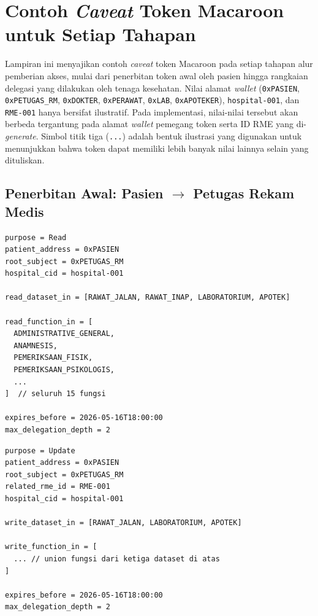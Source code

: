 \chapter{Contoh \textit{Caveat} Token Macaroon untuk Setiap Tahapan}
\label{lampiran:contoh-caveat-macaroon}

Lampiran ini menyajikan contoh \textit{caveat} token Macaroon pada setiap tahapan alur pemberian akses, mulai dari penerbitan token awal oleh pasien hingga rangkaian delegasi yang dilakukan oleh tenaga kesehatan. Nilai alamat \textit{wallet} (\texttt{0xPASIEN}, \texttt{0xPETUGAS\_RM}, \texttt{0xDOKTER}, \texttt{0xPERAWAT}, \texttt{0xLAB}, \texttt{0xAPOTEKER}), \texttt{hospital-001}, dan \texttt{RME-001} hanya bersifat ilustratif. Pada implementasi, nilai-nilai tersebut akan berbeda tergantung pada alamat \textit{wallet} pemegang token serta ID RME yang di-\textit{generate}. Simbol titik tiga (\texttt{...}) adalah bentuk ilustrasi yang digunakan untuk menunjukkan bahwa token dapat memiliki lebih banyak nilai lainnya selain yang dituliskan.

\section*{Penerbitan Awal: Pasien $\rightarrow$ Petugas Rekam Medis}
\label{subsec:contoh-caveat-token-macaroon-penerbitan-awal}

\begin{lstlisting}[caption={Contoh \textit{Caveat} Token \texttt{Read} Awal untuk Petugas Rekam Medis}, label={lst:contoh-token-baca-awal-rekam-medis}]
purpose = Read
patient_address = 0xPASIEN
root_subject = 0xPETUGAS_RM
hospital_cid = hospital-001

read_dataset_in = [RAWAT_JALAN, RAWAT_INAP, LABORATORIUM, APOTEK]

read_function_in = [
  ADMINISTRATIVE_GENERAL,
  ANAMNESIS,
  PEMERIKSAAN_FISIK,
  PEMERIKSAAN_PSIKOLOGIS,
  ...
]  // seluruh 15 fungsi

expires_before = 2026-05-16T18:00:00
max_delegation_depth = 2
\end{lstlisting}

\begin{lstlisting}[caption={Contoh \textit{Caveat} Token \texttt{Update} Awal untuk Petugas Rekam Medis}, label={lst:contoh-token-pembaruan-awal-rekam-medis}]
purpose = Update
patient_address = 0xPASIEN
root_subject = 0xPETUGAS_RM
related_rme_id = RME-001
hospital_cid = hospital-001

write_dataset_in = [RAWAT_JALAN, LABORATORIUM, APOTEK]

write_function_in = [
  ... // union fungsi dari ketiga dataset di atas
]

expires_before = 2026-05-16T18:00:00
max_delegation_depth = 2
\end{lstlisting}

